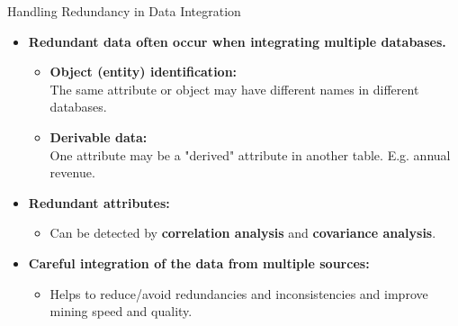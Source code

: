 \begin{frame}{Handling Redundancy in Data Integration}
	\begin{itemize}
		\item \textbf{Redundant data often occur when integrating multiple
			      databases.}
		      \begin{itemize}
			      \item \textbf{Object (entity) identification:} \\
			            The same attribute or object may have different names in different
			            databases.
			      \item \textbf{Derivable data:}\\
			            One attribute may be a "derived" attribute in another table. E.g.
			            annual revenue.
		      \end{itemize}
		\item \textbf{Redundant attributes:}
		      \begin{itemize}
			      \item Can be detected by \textbf{\color{airforceblue}correlation
				            analysis} and \textbf{\color{airforceblue}covariance analysis}.
		      \end{itemize}
		\item \textbf{Careful integration of the data from multiple sources:}
		      \begin{itemize}
			      \item Helps to reduce/avoid redundancies and inconsistencies and
			            improve mining speed and quality.
		      \end{itemize}
	\end{itemize}
\end{frame}

